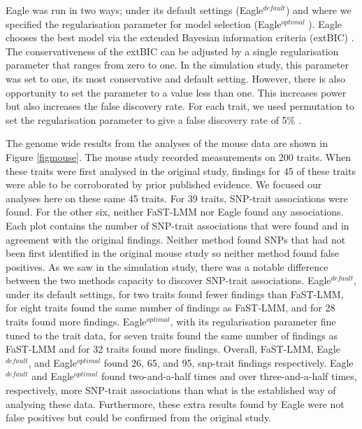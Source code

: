\documentclass{article}
\begin{document}
Eagle was run in two ways; under its default settings (Eagle$^{default}$) and where we specified the regularisation parameter for model selection (Eagle$^{optimal}$ ). Eagle chooses the best model via the extended Bayesian information criteria (extBIC) \cite{chen2008extended}. 
  The conservativeness of the extBIC can be adjusted by a single regularisation parameter that ranges from zero to one. In the simulation study, this parameter was set to one, its most conservative and default setting. However, there is also opportunity to set the parameter to a value less than one. This increases power but also increases the false discovery rate. For each trait, we used permutation to set the regularisation parameter to give a false discovery rate of 5\% .

The genome wide results from the analyses of the mouse data are shown in Figure  \ref{figmouse}. The mouse study recorded
measurements on 200 traits. When these traits were first analysed in the original study, findings for 45 of these traits were able to be 
corroborated by prior published evidence. We focused our analyses here on these same 45 traits. For 39 traits, SNP-trait associations 
were found. For the other six, neither FaST-LMM nor Eagle found any associations. 
Each plot contains the number of SNP-trait associations that were found and in agreement with the original findings. 
Neither method found SNPs that had not been first identified in the original mouse study so neither method found false positives. 
As we saw in the simulation study, there was a notable difference between the two methods capacity to discover SNP-trait associations. Eagle$^{default}$, under its default settings, for two traits found fewer findings than FaST-LMM, for eight traits found the same number 
of findings as FaST-LMM, and for 28 traits found more findings. Eagle$^{optimal}$, 
with its regularisation parameter fine tuned to the trait data, for seven traits found the same number of findings as FaST-LMM and for 32 traits found more findings. Overall, FaST-LMM, Eagle$^{default}$, and Eagle$^{optimal}$ found 26, 65, and 95, snp-trait findings respectively. 
Eagle$^{default}$ and Eagle$^{optimal}$ found two-and-a-half times and over three-and-a-half times, respectively, more SNP-trait 
associations than what is the established way of analysing these data. Furthermore, these extra results found by Eagle were not 
false positives but could be confirmed from the original study. 
\end{document}
